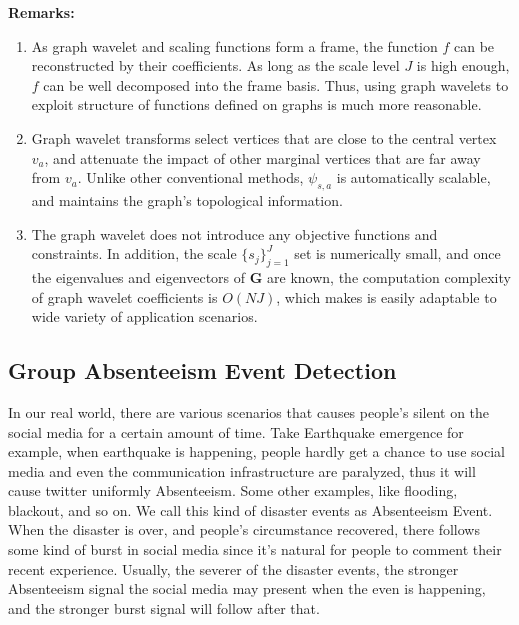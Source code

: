 {\textbf{Remarks:}}
\begin{enumerate}
\item As graph wavelet and scaling functions form a frame, the function $f$ can be reconstructed by their coefficients.
As long as the scale level $J$ is high enough, $f$ can be well decomposed into the frame basis. Thus, using graph wavelets to exploit structure of functions defined on graphs is much more reasonable.
\item Graph wavelet transforms select vertices that are close to the central vertex $v_a$, and attenuate the impact of other marginal vertices that are far away from $v_a$.
Unlike other conventional methods,  $\psi_{s,a}$ is automatically scalable, and maintains the graph's topological information.
\item The graph wavelet does not introduce any objective functions and constraints. In addition, the scale $\{s_j\}_{j=1}^J$ set is numerically small, and once the eigenvalues and eigenvectors of $\mathbf{G}$ are known, the computation complexity of graph wavelet coefficients is $O(NJ)$, which makes is easily adaptable to wide variety of application scenarios.
\end{enumerate}


\subsection{Group Absenteeism Event Detection}
\label{sec:Group Absenteeism Event Detection}
In our real world, there are various scenarios that causes people's silent on the social media for a certain amount of time. Take Earthquake emergence for example, when earthquake is happening, people hardly get a chance to use social media and even the communication infrastructure are paralyzed, thus it will cause twitter uniformly Absenteeism. Some other examples, like flooding, blackout, and so on. We call this kind of disaster events as Absenteeism Event. When the disaster is over, and people's circumstance recovered, there follows some kind of burst in social media since it's natural for people to comment their recent experience. Usually, the severer of the disaster events, the stronger Absenteeism signal the social media may present when the even is happening, and the stronger burst signal will follow after that.

